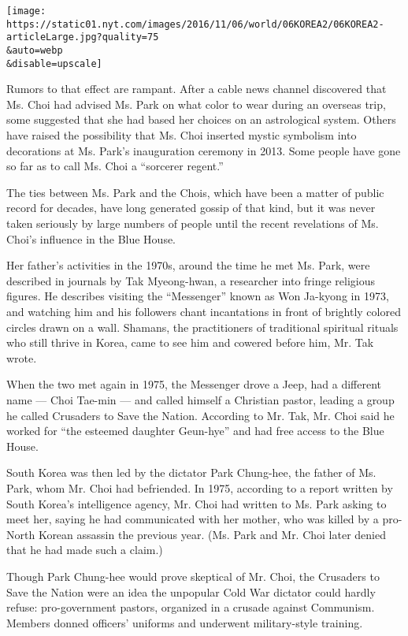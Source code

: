\texttt{[image: https://static01.nyt.com/images/2016/11/06/world/06KOREA2/06KOREA2-articleLarge.jpg?quality=75\\\&auto=webp\\\&disable=upscale]}

Rumors to that effect are rampant. After a cable news channel discovered
that Ms. Choi had advised Ms. Park on what color to wear during an
overseas trip, some suggested that she had based her choices on an
astrological system. Others have raised the possibility that Ms. Choi
inserted mystic symbolism into decorations at Ms. Park's inauguration
ceremony in 2013. Some people have gone so far as to call Ms. Choi a
``sorcerer regent.''

The ties between Ms. Park and the Chois, which have been a matter of
public record for decades, have long generated gossip of that kind, but
it was never taken seriously by large numbers of people until the recent
revelations of Ms. Choi's influence in the Blue House.

Her father's activities in the 1970s, around the time he met Ms. Park,
were described in journals by Tak Myeong-hwan, a researcher into fringe
religious figures. He describes visiting the ``Messenger'' known as Won
Ja-kyong in 1973, and watching him and his followers chant incantations
in front of brightly colored circles drawn on a wall. Shamans, the
practitioners of traditional spiritual rituals who still thrive in
Korea, came to see him and cowered before him, Mr. Tak wrote.

When the two met again in 1975, the Messenger drove a Jeep, had a
different name --- Choi Tae-min --- and called himself a Christian
pastor, leading a group he called Crusaders to Save the Nation.
According to Mr. Tak, Mr. Choi said he worked for ``the esteemed
daughter Geun-hye'' and had free access to the Blue House.

South Korea was then led by the dictator Park Chung-hee, the father of
Ms. Park, whom Mr. Choi had befriended. In 1975, according to a report
written by South Korea's intelligence agency, Mr. Choi had written to
Ms. Park asking to meet her, saying he had communicated with her mother,
who was killed by a pro-North Korean assassin the previous year. (Ms.
Park and Mr. Choi later denied that he had made such a claim.)

Though Park Chung-hee would prove skeptical of Mr. Choi, the Crusaders
to Save the Nation were an idea the unpopular Cold War dictator could
hardly refuse: pro-government pastors, organized in a crusade against
Communism. Members donned officers' uniforms and underwent
military-style training.

